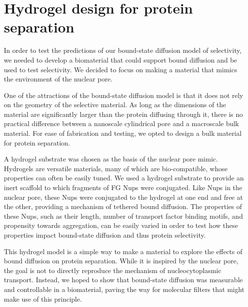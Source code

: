 \chapter{Hydrogel design for protein separation}\label{ch03}

In order to test the predictions of our bound-state diffusion model of selectivity, we needed to develop a biomaterial that could support bound diffusion and be used to test selectivity.  %
We decided to focus on making a material that mimics the environment of the nuclear pore.

One of the attractions of the bound-state diffusion model is that it does not rely on the geometry of the selective material.  As long as the dimensions of the material are significantly larger than the protein diffusing through it, there is no practical difference between a nanoscale cylindrical pore and a macroscale bulk material.  For ease of fabrication and testing, we opted to design a bulk material for protein separation.

A hydrogel substrate was chosen as the basis of the nuclear pore mimic.  %
Hydrogels are versatile materials, many of which are bio-compatible, whose properties can often be easily tuned.  We used a hydrogel substrate to provide an inert scaffold to which fragments of FG Nups were conjugated.  Like Nups in the nuclear pore, these Nups were conjugated to the hydrogel at one end and free at the other, providing a mechanism of tethered bound diffusion.  The properties of these Nups, such as their length, number of transport factor binding motifs, and propensity towards aggregation, can be easily varied in order to test how these properties impact bound-state diffusion and thus protein selectivity.

This hydrogel model is a simple way to make a material to explore the effects of bound diffusion on protein separation.  While it is inspired by the nuclear pore, the goal is not to directly reproduce the mechanism of nucleocytoplasmic transport.  Instead, we hoped to show that bound-state diffusion was measurable and controllable in a biomaterial, paving the way for molecular filters that might make use of this principle.

